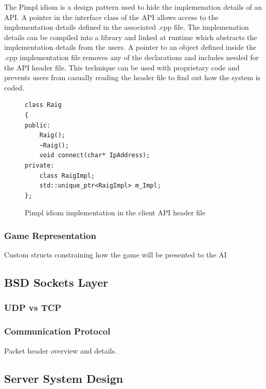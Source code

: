 \documentclass[12pt,a4paper,titlepage]{article}
\begin{document}
The Pimpl idiom is a design pattern used to hide the implemenation details of an API. A pointer in the interface class of the API allows access to the implementation details defined in the associated .cpp file. The implemenation details can be compiled into a library and linked at runtime which abstracts the implementation details from the users. A pointer to an object defined inside the .cpp implementation file removes any of the declarations and includes needed for the API header file. This technique can be used with proprietary code and prevents users from casually reading the header file to find out how the system is coded. 

\begin{figure}[H]
\begin{lstlisting}
class Raig
{
public:
	Raig();
	~Raig();
	void connect(char* IpAddress);
private:
	class RaigImpl; 
	std::unique_ptr<RaigImpl> m_Impl;
};
\end{lstlisting}
	\caption{Pimpl idiom implementation in the client API header file}
	\label{code:pimplidiom}
\end{figure}



\subsubsection{Game Representation}

Custom structs constraining how the game will be presented to the AI


\subsection{BSD Sockets Layer}
\label{section:networklayer}

\subsubsection{UDP vs TCP}

\subsubsection{Communication Protocol}

Packet header overview and details.\\

\subsection{Server System Design}
\label{section:serverdesign}
\end{document}
